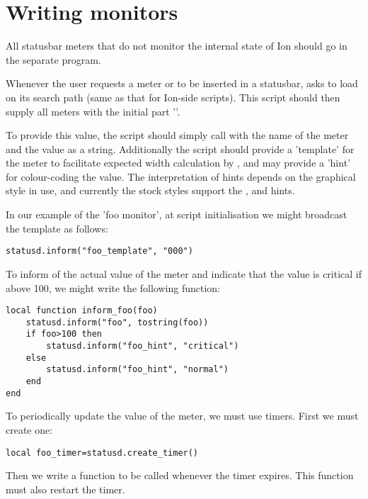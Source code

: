 
\section{Writing  monitors}
\label{sec:statusd}

All statusbar meters that do not monitor the internal state of Ion should
go in the separate  program. 

Whenever the user requests a meter  or  to be 
inserted in a statusbar,  asks  to
load  on its search path (same as that for Ion-side 
scripts). This script should then supply all meters with the initial part
''.

To provide this value, the script should simply call 
with the name of the meter and the value as a string.
Additionally the script should provide a 'template' for the meter to
facilitate expected width calculation by , and
may provide a 'hint' for colour-coding the value. The interpretation
of hints depends on the graphical style in use, and currently the
stock styles support the ,  and 
 hints.


In our example of the 'foo monitor', at script initialisation we might broadcast
the template as follows:

\begin{verbatim}
statusd.inform("foo_template", "000")
\end{verbatim}

To inform  of the actual value of the meter and
indicate that the value is critical if above 100, we might write the
following function:

\begin{verbatim}
local function inform_foo(foo)
    statusd.inform("foo", tostring(foo))
    if foo>100 then
        statusd.inform("foo_hint", "critical")
    else
        statusd.inform("foo_hint", "normal")
    end
end    
\end{verbatim}
    
To periodically update the value of the meter, we must use timers.
First we must create one:

\begin{verbatim}
local foo_timer=statusd.create_timer()
\end{verbatim}

Then we write a function to be called whenever the timer expires.
This function must also restart the timer.

